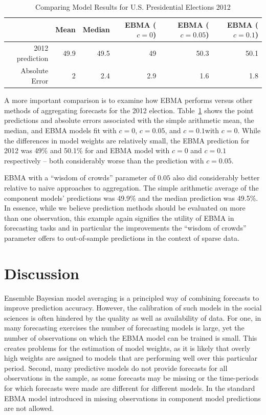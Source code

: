\documentclass[12pt,fullpage,endnotes]{article}
\begin{document}
\begin{table}[ht]
\caption{Comparing Model Results for U.S. Presidential Elections 2012}
\label{presModel12}
\begin{center}
\begin{tabular}{rrrrrr}
  \toprule
 & Mean & Median & EBMA ($c=0$) & EBMA ($c=0.05$) & EBMA ($c=0.1$) \\ 
  \midrule
2012 prediction & 49.9 & 49.5 & 49 & 50.3 & 50.1 \\ 
  Absolute Error & 2 & 2.4 & 2.9 & 1.6 & 1.8 \\ 
   \bottomrule
\end{tabular}
\end{center}
\end{table}

A more important comparison is to examine how EBMA performs versus
other methods of aggregating forecasts for the 2012 election.
Table~\ref{presModel12} shows the point predictions and absolute
errors associated with the simple arithmetic mean, the median, and
EBMA models fit with $c=0$, $c=0.05$, and $c=0.1$with $c=0$.  While
the differences in model weights are relatively small, the EBMA
prediction for 2012 was 49\% and 50.1\% for and EBMA model with $c=0$
and $c=0.1$ respectively -- both considerably worse than the
prediction with $c=0.05$. 

EBMA with a ``wisdom of crowds'' parameter of $0.05$ also did
considerably better relative to naive approaches to aggregation. The simple
arithmetic average of the component models' predictions was 49.9\% and
the median prediction was 49.5\%. In essence, while we believe
prediction methods should be evaluated on more than one observation,
this example again signifies the utility of EBMA in forecasting tasks
and in particular the improvements the ``wisdom of crowds'' parameter
offers to out-of-sample predictions in the context of sparse data.


\section{Discussion} 
Ensemble Bayesian model averaging is a principled way of combining
forecasts to improve prediction accuracy. However, the calibration of
such models in the social sciences is often hindered by the quality as
well as availability of data. For one, in many forecasting exercises
the number of forecasting models is large, yet the number of
observations on which the EBMA model can be trained is small. This
creates problems for the estimation of model weights, as it is likely
that overly high weights are assigned to models that are performing
well over this particular period. Second, many predictive models do
not provide forecasts for all observations in the sample, as some
forecasts may be missing or the time-periods for which forecasts were
made are different for different models. In the standard EBMA model
introduced in \citet{mhw:2012} missing observations in component model
predictions are not allowed.
\end{document}
